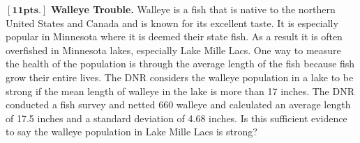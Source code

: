 \item $\mathbf{[11pts.]}$ \textbf{Walleye Trouble.} Walleye is a fish that is native to the northern United States and Canada and is known for its excellent taste. It is especially popular in Minnesota where it is deemed their state fish. As a result it is often overfished in Minnesota lakes, especially Lake Mille Lacs. One way to measure the health of the population is through the average length of the fish  because fish grow their entire lives. The DNR considers the walleye population in a lake to be strong if the mean length of walleye in the lake is more than 17 inches. The DNR conducted a fish survey and netted 660 walleye and calculated an average length of 17.5 inches and a standard deviation of 4.68 inches. Is this sufficient evidence to say the walleye population in Lake Mille Lacs is strong? 

